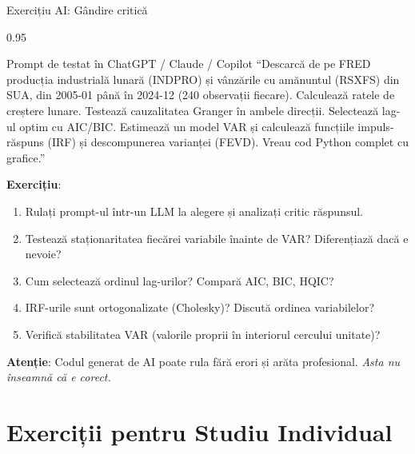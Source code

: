 \documentclass[9pt, aspectratio=169, t]{beamer}
\begin{document}
\begin{frame}{Exercițiu AI: Gândire critică}
    \begin{cminipage}{0.95\textwidth}
    \vspace{-3mm}
    \begin{block}{\footnotesize Prompt de testat în ChatGPT / Claude / Copilot}
        {\footnotesize
        ``Descarcă de pe FRED producția industrială lunară (INDPRO) și vânzările cu amănuntul (RSXFS) din SUA, din 2005-01 până în 2024-12 (240 observații fiecare). Calculează ratele de creștere lunare. Testează cauzalitatea Granger în ambele direcții. Selectează lag-ul optim cu AIC/BIC. Estimează un model VAR și calculează funcțiile impuls-răspuns (IRF) și descompunerea varianței (FEVD). Vreau cod Python complet cu grafice.''
        }
    \end{block}
    \vspace{-2mm}
    {\footnotesize
    \textbf{Exercițiu}:
    \begin{enumerate}\setlength{\itemsep}{0pt}
        \item Rulați prompt-ul într-un LLM la alegere și analizați critic răspunsul.
        \item Testează staționaritatea fiecărei variabile înainte de VAR? Diferențiază dacă e nevoie?
        \item Cum selectează ordinul lag-urilor? Compară AIC, BIC, HQIC?
        \item IRF-urile sunt ortogonalizate (Cholesky)? Discută ordinea variabilelor?
        \item Verifică stabilitatea VAR (valorile proprii în interiorul cercului unitate)?
    \end{enumerate}
    }
    \vspace{-2mm}
    \begin{alertblock}{}
        {\footnotesize \textbf{Atenție}: Codul generat de AI poate rula fără erori și arăta profesional. \textit{Asta nu înseamnă că e corect.}}
    \end{alertblock}
    \end{cminipage}
\end{frame}

\section{Exerciții pentru Studiu Individual}
\end{document}
